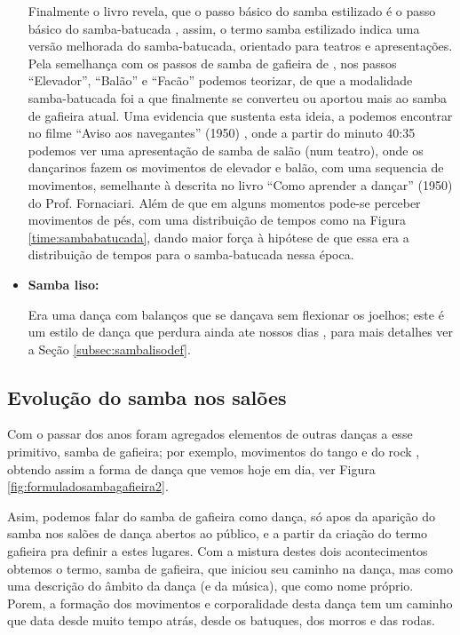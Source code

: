 \begin{itemize}
Finalmente o livro revela,
que o passo básico do samba estilizado é o passo básico do samba-batucada \cite[pp. 163]{fornaciari1950aprender},
assim, o termo samba estilizado indica uma versão melhorada do samba-batucada,
orientado para teatros e apresentações. Pela semelhança com os passos de samba de gafieira de \AnoLivro,
nos passos ``Elevador'', ``Balão'' e ``Facão'' podemos teorizar, de que a modalidade samba-batucada foi
a que finalmente se converteu ou aportou mais ao samba de gafieira atual.
Uma evidencia que sustenta esta ideia, a podemos encontrar no filme ``Aviso aos navegantes'' (1950) \cite[min. 40:35]{AtlantidaDance},
onde a partir do minuto 40:35 podemos ver uma apresentação de samba de salão (num teatro),
onde os dançarinos fazem os movimentos de elevador e balão, com uma sequencia de movimentos,
semelhante à descrita no livro ``Como aprender a dançar'' (1950) do Prof. Fornaciari.
Além de que em alguns momentos pode-se perceber movimentos de pés, 
com uma distribuição de tempos como na Figura \ref{time:sambabatucada},
dando maior força à hipótese de que essa era a distribuição de tempos para o samba-batucada nessa época. 

\item \textbf{Samba liso:}

Era uma dança com balanços que se dançava sem flexionar os joelhos;
este é um estilo de dança que perdura ainda ate nossos 
dias \cite[pp. 58,62]{freitas1959danca} \cite[pp. 61]{fornaciari1950aprender} \cite[pp. 143]{perna2002samba}, 
para mais detalhes ver a Seção \ref{subsec:sambalisodef}.
\end{itemize}

\subsection{Evolução do samba nos salões}

Com o passar dos anos foram agregados elementos de outras danças a esse primitivo, samba de gafieira;
por exemplo, movimentos do tango e do rock \cite[pp. 142]{perna2002samba}, 
obtendo assim a forma de dança que vemos hoje em dia, ver Figura \ref{fig:formuladosambagafieira2}.

Asim, podemos falar do samba de gafieira como dança, só apos da aparição do samba nos
salões de dança abertos ao público, e a partir da criação do termo gafieira pra definir a estes lugares.
Com a mistura destes dois acontecimentos obtemos o termo, samba de gafieira,
que iniciou seu caminho na dança, mas como uma descrição do âmbito da dança (e da música), que como nome próprio.
Porem, a formação dos movimentos e corporalidade desta dança tem um caminho que data desde muito tempo atrás,
desde os batuques, dos morros e das rodas.


